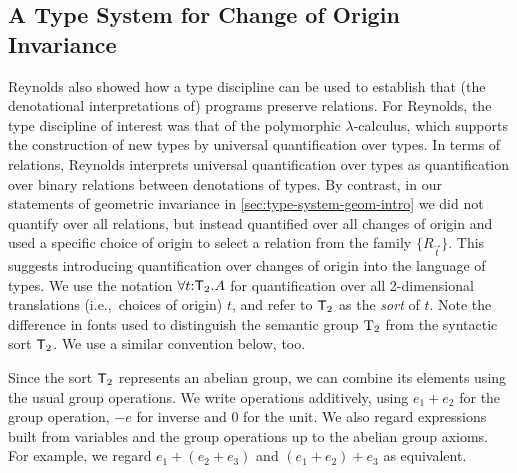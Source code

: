 
\subsection{A Type System for Change of Origin Invariance}
\label{sec:type-system-geom-intro}

Reynolds also showed how a type discipline can be used to establish
that (the denotational interpretations of) programs preserve
relations. For Reynolds, the type discipline of interest was that of
the polymorphic $\lambda$-calculus, which supports the construction of
new types by universal quantification over types.
In terms of relations, Reynolds interprets universal quantification
over types as quantification over binary relations between denotations
of types. By contrast, in our statements of geometric invariance in
\autoref{sec:type-system-geom-intro} we did not quantify over all
relations, but instead quantified over all changes of origin and used
a specific choice of origin to select a relation from the family
$\{R_{\vec{t}}\}$. This suggests introducing quantification over
changes of origin into the language of types. We use the notation
$\forall t \mathord: \mathsf{T}_2. A$ for quantification over all
2-dimensional translations (i.e.,~choices of origin) $t$, and refer to
$\mathsf{T}_2$ as the \emph{sort} of $t$. Note the difference in
fonts used to distinguish the semantic group $\mathrm{T}_2$ from the
syntactic sort $\mathsf{T}_2$. We use a similar convention
below, too.

Since the sort $\mathsf{T}_2$ represents an abelian group, we can
combine its elements using the usual group operations. We write
operations additively, using $e_1 + e_2$ for the group operation, $-e$
for inverse and $0$ for the unit.  We also regard expressions built
from variables and the group operations up to the abelian group
axioms. For example, we regard $e_1 + (e_2 + e_3)$ and $(e_1 + e_2) +
e_3$ as equivalent.

